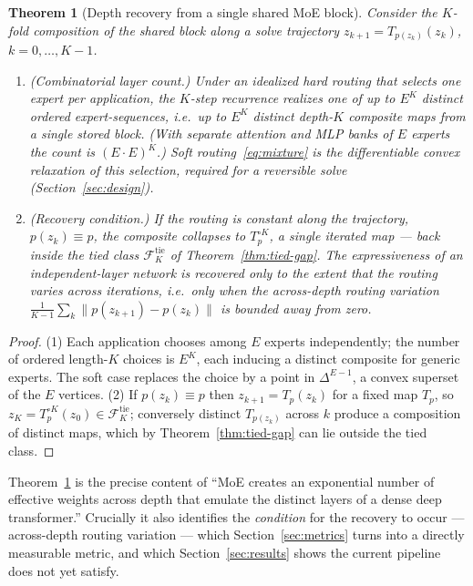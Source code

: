 \documentclass[11pt]{article}
\newtheorem{theorem}{Theorem}[section]
\newcommand{\simplex}{\Delta}
\begin{document}
\begin{theorem}[Depth recovery from a single shared MoE block]
\label{thm:moe-depth}
Consider the $K$-fold composition of the shared block along a solve trajectory
$z_{k+1}=T_{p(z_k)}(z_k)$, $k=0,\dots,K-1$.
\begin{enumerate}[leftmargin=2em,itemsep=0.2em]
  \item \emph{(Combinatorial layer count.)} Under an idealized hard routing that selects
    one expert per application, the $K$-step recurrence realizes one of up to $E^{K}$
    distinct ordered expert-sequences, i.e.\ up to $E^{K}$ distinct depth-$K$ composite
    maps from a single stored block.  (With separate attention and MLP banks of $E$
    experts the count is $(E\cdot E)^{K}$.)  Soft routing~\eqref{eq:mixture} is the
    differentiable convex relaxation of this selection, required for a reversible solve
    (Section~\ref{sec:design}).
  \item \emph{(Recovery condition.)} If the routing is constant along the trajectory,
    $p(z_k)\equiv p$, the composite collapses to $T_p^{\circ K}$, a single iterated map
    --- back inside the tied class $\mathcal F^{\mathrm{tie}}_K$ of
    Theorem~\ref{thm:tied-gap}.  The expressiveness of an independent-layer network is
    recovered only to the extent that the routing \emph{varies across iterations}, i.e.\
    only when the across-depth routing variation
    $\frac1{K-1}\sum_k \|p(z_{k+1})-p(z_k)\|$ is bounded away from zero.
\end{enumerate}
\end{theorem}

\begin{proof}
(1) Each application chooses among $E$ experts independently; the number of ordered
length-$K$ choices is $E^K$, each inducing a distinct composite for generic experts.
The soft case replaces the choice by a point in $\simplex^{E-1}$, a convex superset of
the $E$ vertices.  (2) If $p(z_k)\equiv p$ then $z_{k+1}=T_p(z_k)$ for a fixed map $T_p$,
so $z_K=T_p^{\circ K}(z_0)\in\mathcal F^{\mathrm{tie}}_K$; conversely distinct $T_{p(z_k)}$
across $k$ produce a composition of distinct maps, which by Theorem~\ref{thm:tied-gap}
can lie outside the tied class.
\end{proof}

Theorem~\ref{thm:moe-depth} is the precise content of ``MoE creates an exponential number
of effective weights across depth that emulate the distinct layers of a dense deep
transformer.''  Crucially it also identifies the \emph{condition} for the recovery to
occur --- across-depth routing variation --- which Section~\ref{sec:metrics} turns into a
directly measurable metric, and which Section~\ref{sec:results} shows the current pipeline
does not yet satisfy.
\end{document}

